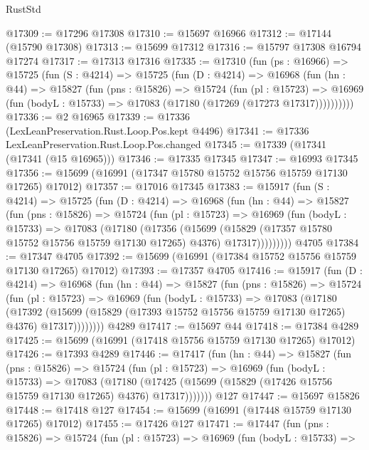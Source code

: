 \begin{lexlean}{RustStd}
\begin{coremodule}
@17309 := @17296 @17308
@17310 := @15697 @16966
@17312 := @17144 (@15790 @17308)
@17313 := @15699 @17312
@17316 := @15797 @17308 @16794 @17274
@17317 := @17313 @17316
@17335 := @17310
    (fun (ps : @16966) =>
    @15725
      (fun (S : @4214) =>
      @15725
        (fun (D : @4214) =>
        @16968
          (fun (hn : @44) =>
          @15827
            (fun (pns : @15826) =>
            @15724
              (fun (pl : @15723) =>
              @16969 (fun (bodyL : @15733) => @17083 (@17180 (@17269 (@17273 @17317))))))))))
@17336 := @2 @16965
@17339 := @17336 (LexLeanPreservation.Rust.Loop.Pos.kept @4496)
@17341 := @17336 LexLeanPreservation.Rust.Loop.Pos.changed
@17345 := @17339 (@17341 (@17341 (@15 @16965)))
@17346 := @17335 @17345
@17347 := @16993 @17345
@17356 := @15699 (@16991 (@17347 @15780 @15752 @15756 @15759 @17130 @17265) @17012)
@17357 := @17016 @17345
@17383 := @15917
    (fun (S : @4214) =>
    @15725
      (fun (D : @4214) =>
      @16968
        (fun (hn : @44) =>
        @15827
          (fun (pns : @15826) =>
          @15724
            (fun (pl : @15723) =>
            @16969
              (fun (bodyL : @15733) =>
              @17083
                (@17180
                  (@17356
                    (@15699
                      (@15829 (@17357 @15780 @15752 @15756 @15759 @17130 @17265) @4376)
                      @17317)))))))))
    @4705
@17384 := @17347 @4705
@17392 := @15699 (@16991 (@17384 @15752 @15756 @15759 @17130 @17265) @17012)
@17393 := @17357 @4705
@17416 := @15917
    (fun (D : @4214) =>
    @16968
      (fun (hn : @44) =>
      @15827
        (fun (pns : @15826) =>
        @15724
          (fun (pl : @15723) =>
          @16969
            (fun (bodyL : @15733) =>
            @17083
              (@17180
                (@17392
                  (@15699 (@15829 (@17393 @15752 @15756 @15759 @17130 @17265) @4376) @17317))))))))
    @4289
@17417 := @15697 @44
@17418 := @17384 @4289
@17425 := @15699 (@16991 (@17418 @15756 @15759 @17130 @17265) @17012)
@17426 := @17393 @4289
@17446 := @17417
    (fun (hn : @44) =>
    @15827
      (fun (pns : @15826) =>
      @15724
        (fun (pl : @15723) =>
        @16969
          (fun (bodyL : @15733) =>
          @17083
            (@17180
              (@17425 (@15699 (@15829 (@17426 @15756 @15759 @17130 @17265) @4376) @17317)))))))
    @127
@17447 := @15697 @15826
@17448 := @17418 @127
@17454 := @15699 (@16991 (@17448 @15759 @17130 @17265) @17012)
@17455 := @17426 @127
@17471 := @17447
    (fun (pns : @15826) =>
    @15724
      (fun (pl : @15723) =>
      @16969
        (fun (bodyL : @15733) =>

\end{coremodule}
\end{lexlean}
